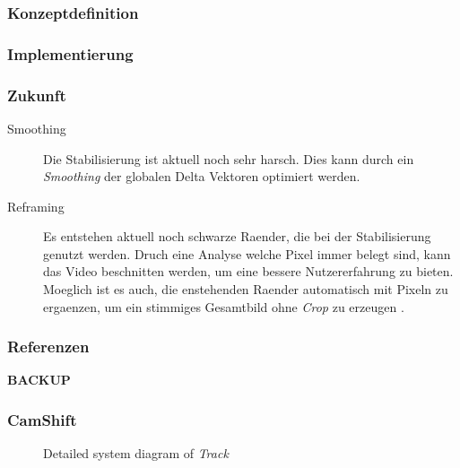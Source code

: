 \documentclass{beamer}
\begin{document}
\begin{frame}
\frametitle{Konzeptdefinition}
\end{frame}

\begin{frame}
\frametitle{Implementierung}
\end{frame}

\begin{frame}
\frametitle{Zukunft}
    \begin{description}
        \item[Smoothing] Die Stabilisierung ist aktuell noch sehr harsch. Dies kann durch ein \textit{Smoothing} der globalen Delta Vektoren optimiert werden.
        \item[Reframing] Es entstehen aktuell noch schwarze Raender, die bei der Stabilisierung genutzt werden. Druch eine Analyse welche Pixel immer belegt sind, kann das Video beschnitten werden, um eine bessere Nutzererfahrung zu bieten. Moeglich ist es auch, die enstehenden Raender automatisch mit Pixeln zu ergaenzen, um ein stimmiges Gesamtbild ohne \textit{Crop} zu erzeugen \cite{blockTang}.
    \end{description}
\end{frame}

\begin{frame}%
\frametitle{Referenzen}
    \printbibliography[heading=none]
\end{frame}

\begin{frame}
\begin{center}
    \textbf{\huge BACKUP}
\end{center}
\end{frame}

\begin{frame}
    \frametitle{CamShift}
    \begin{figure}[h!]
        \resizebox{\textwidth}{!}{%
        }
        \caption{Detailed system diagram of \textit{Track}}
    \end{figure}
\end{frame}
\end{document}
